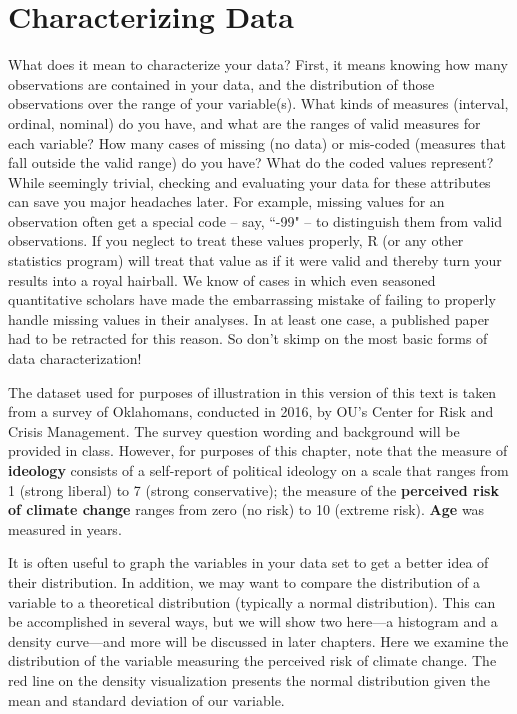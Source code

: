 \documentclass[11pt,openany]{book}\usepackage[]{graphicx}\usepackage[]{color}
\begin{document}
\section{Characterizing Data}

What does it mean to characterize your data? First, it means knowing how many observations are contained in your data, and the distribution of those observations over the range of your variable(s). What kinds of measures (interval, ordinal, nominal) do you have, and what are the ranges of valid measures for each variable? How many cases of missing (no data) or mis-coded (measures that fall outside the valid range) do you have? What do the coded values represent? While seemingly trivial, checking and evaluating your data for these attributes can save you major headaches later. For example, missing values for an observation often get a special code -- say, ``-99" -- to distinguish them  from valid observations. If you neglect to treat these values properly, R (or any other statistics program) will treat that value as if it were valid and thereby turn your results into a royal hairball. We know of cases in which even seasoned quantitative scholars have made the embarrassing mistake of failing to properly handle missing values in their analyses. In at least one case, a published paper had to be retracted for this reason. So don't skimp on the most basic forms of data characterization!

The dataset used for purposes of illustration in this version of this text is taken from a survey of Oklahomans, conducted in 2016, by OU's Center for Risk and Crisis Management. The survey question wording and background will be provided in class. However, for purposes of this chapter, note that the measure of  \textbf{ideology} consists of a self-report of political ideology on a scale that ranges from 1 (strong liberal) to 7 (strong conservative); the measure of the \textbf{perceived risk of climate change} ranges from zero (no risk) to 10 (extreme risk). \textbf{Age} was measured in years. 

It is often useful to graph the variables in your data set to get a better idea of their distribution. In addition, we may want to compare the distribution of a variable to a theoretical distribution (typically a normal distribution). This can be accomplished in several ways, but we will show two here---a histogram and a density curve---and more will be discussed in later chapters. Here we examine the distribution of the variable measuring the perceived risk of climate change. The red line on the density visualization presents the normal distribution given the mean and standard deviation of our variable.
\end{document}
